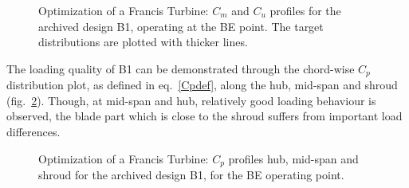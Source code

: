 \begin{figure}[h!]
\begin{minipage}[b]{1\linewidth}
 \centering
\end{minipage}
\caption{Optimization of a Francis Turbine: $C_m$ and $C_u$ profiles for the archived design B1, operating at the BE point. The target distributions are plotted with thicker lines.}
\label{Francis-B1-OUT}
\end{figure}

The loading quality of B1 can be demonstrated through the chord-wise $C_p$ distribution plot, as defined in eq.\ \ref{Cpdef}, along the hub, mid-span and shroud (fig.\ \ref{Francis-B1-LOAD}). Though, at mid-span and hub, relatively good loading behaviour is observed, the blade part which is close to the shroud suffers from important load differences.      

\begin{figure}[h!]
\begin{minipage}[b]{1\linewidth}
 \centering
\end{minipage}
\caption{Optimization of a Francis Turbine: $C_p$ profiles hub, mid-span and shroud for the archived design B1, for the BE operating point.}
\label{Francis-B1-LOAD}
\end{figure}

